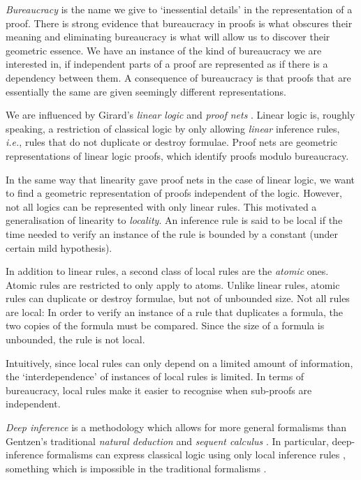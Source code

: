 \emph{Bureaucracy} is the name we give to `inessential details' in the representation of a proof. There is strong evidence that bureaucracy in proofs is what obscures their meaning and eliminating bureaucracy is what will allow us to discover their geometric essence. We have an instance of the kind of bureaucracy we are interested in, if independent parts of a proof are represented as if there is a dependency between them. A consequence of bureaucracy is that proofs that are essentially the same are given seemingly different representations.


We are influenced by Girard's \emph{linear logic} and \emph{proof nets} \cite{Gira:87:Linear-L:wm}. Linear logic is, roughly speaking, a restriction of classical logic by only allowing \emph{linear} inference rules, \emph{i.e.}, rules that do not duplicate or destroy formulae. Proof nets are geometric representations of linear logic proofs, which identify proofs modulo bureaucracy.

In the same way that linearity gave proof nets in the case of linear logic, we want to find a geometric representation of proofs independent of the logic. However, not all logics can be represented with only linear rules. This motivated a generalisation of linearity to \emph{locality}. An inference rule is said to be local if the time needed to verify an instance of the rule is bounded by a constant (under certain mild hypothesis).


In addition to linear rules, a second class of local rules are the \emph{atomic} ones. Atomic rules are restricted to only apply to atoms. Unlike linear rules, atomic rules can duplicate or destroy formulae, but not of unbounded size. Not all rules are local: In order to verify an instance of a rule that duplicates a formula, the two copies of the formula must be compared. Since the size of a formula is unbounded, the rule is not local.

Intuitively, since local rules can only depend on a limited amount of information, the `interdependence' of instances of local rules is limited. In terms of bureaucracy, local rules make it easier to recognise when sub-proofs are independent. 

\emph{Deep inference} \cite{Gugl:06:A-System:kl} is a methodology which allows for more general formalisms than Gentzen's traditional \emph{natural deduction} and \emph{sequent calculus} \cite{Gent:69:Investig:xi}. In particular, deep-inference formalisms can express classical logic using only local inference rules \cite{BrunTiu:01:A-Local-:mz}, something which is impossible in the traditional formalisms \cite{Brun:03:Two-Rest:mn}.


